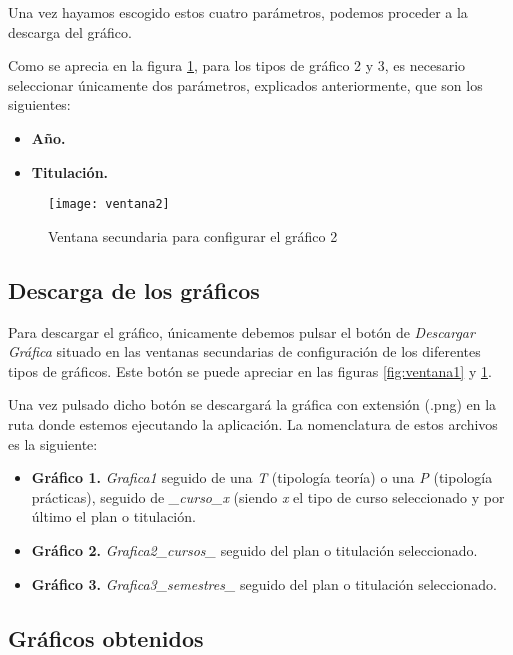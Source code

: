Una vez hayamos escogido estos cuatro parámetros, podemos proceder a la descarga del gráfico.


Como se aprecia en la figura \ref{fig:ventana2}, para los tipos de gráfico 2 y 3, es necesario seleccionar únicamente dos parámetros, explicados anteriormente, que son los siguientes:

\begin{itemize}
\item \textbf{Año.}
\item \textbf{Titulación.}
\end{itemize}
  
\begin{figure}%
		\centering
		\texttt{[image: ventana2]}
		\caption{Ventana secundaria para configurar el gráfico 2}\label{fig:ventana2}
	\end{figure}
	
	
\subsection{Descarga de los gráficos}

Para descargar el gráfico, únicamente debemos pulsar el botón de \emph{Descargar Gráfica} situado en las ventanas secundarias de configuración de los diferentes tipos de gráficos. Este botón se puede apreciar en las figuras \ref{fig:ventana1} y \ref{fig:ventana2}.

Una vez pulsado dicho botón se descargará la gráfica con extensión (.png) en la ruta donde estemos ejecutando la aplicación.
La nomenclatura de estos archivos es la siguiente:
 
\begin{itemize}
\item \textbf{Gráfico 1.} \emph{Grafica1} seguido de una \emph{T} (tipología teoría) o una \emph{P} (tipología prácticas), seguido de \emph{\_curso\_x} (siendo \emph{x} el tipo de curso seleccionado y por último el plan o titulación.
\item \textbf{Gráfico 2.} \emph{Grafica2\_cursos\_} seguido del plan o titulación seleccionado.
\item \textbf{Gráfico 3.} \emph{Grafica3\_semestres\_} seguido del plan o titulación seleccionado.
\end{itemize}



\subsection{Gráficos obtenidos}

